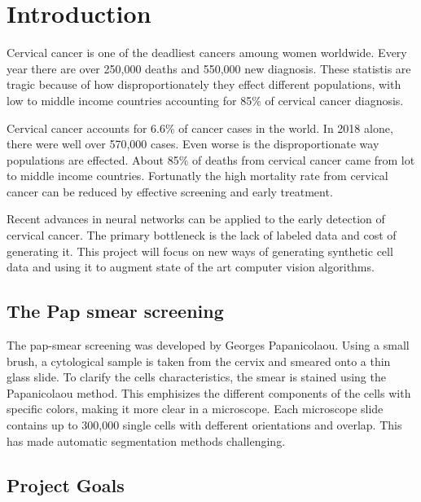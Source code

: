 \documentclass[ms,electronic,oneside,twosidetoc,letterpaper,chaptercenter,parttop]{byumsphd}
\title{\Title}
\author{\Author}
\begin{document}
\maketitle
{}

\chapter{Introduction}

Cervical cancer is one of the deadliest cancers amoung women worldwide. Every year there are over
250,000 deaths and 550,000 new diagnosis. These statistis are tragic because of how disproportionately
they effect different populations, with low to middle income countries accounting for 85\% of cervical cancer diagnosis.\cite{15}

Cervical cancer accounts for 6.6\% of cancer cases in the world. In 2018 alone, there were well
over 570,000 cases. Even worse is the disproportionate way populations are effected. About 85\%
of deaths from cervical cancer came from lot to middle income countries.
Fortunatly the high mortality rate from cervical cancer can be reduced by effective screening and early
treatment.

Recent advances in neural networks can be applied to the early detection of cervical cancer.
The primary bottleneck is the lack of labeled data and cost of generating it. This project
will focus on new ways of generating synthetic cell data and using it to augment state of the art computer 
vision algorithms.


\section{The Pap smear screening}

The pap-smear screening was developed by Georges Papanicolaou. Using a small brush, a cytological sample is taken from the cervix and smeared onto a thin glass slide. 
To clarify the cells characteristics, the smear is stained using the Papanicolaou method. This emphisizes the different components of the cells with specific colors, making it more clear in a microscope.\cite{herlev2}
Each microscope slide contains up to 300,000 single cells with defferent orientations and overlap\cite{herlev2}. This has made automatic segmentation methods challenging.

\section{Project Goals}
\end{document}
